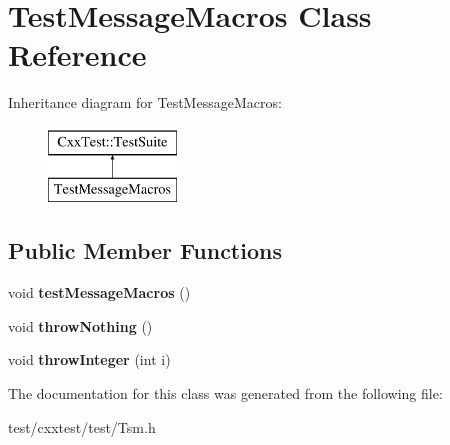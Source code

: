\hypertarget{classTestMessageMacros}{\section{Test\-Message\-Macros Class Reference}
\label{classTestMessageMacros}
}
Inheritance diagram for Test\-Message\-Macros\-:\begin{figure}[H]
\begin{center}
\leavevmode
\includegraphics[height=2.000000cm]{classTestMessageMacros}
\end{center}
\end{figure}
\subsection*{Public Member Functions}
\begin{DoxyCompactItemize}
\item 
\hypertarget{classTestMessageMacros_aef42480466574790df96a076bf029183}{void {\bfseries test\-Message\-Macros} ()}\label{classTestMessageMacros_aef42480466574790df96a076bf029183}

\item 
\hypertarget{classTestMessageMacros_adc88990a944cf8aadaa4abffa81a012c}{void {\bfseries throw\-Nothing} ()}\label{classTestMessageMacros_adc88990a944cf8aadaa4abffa81a012c}

\item 
\hypertarget{classTestMessageMacros_a99bd97161c31c0488f766d09325e2977}{void {\bfseries throw\-Integer} (int i)}\label{classTestMessageMacros_a99bd97161c31c0488f766d09325e2977}

\end{DoxyCompactItemize}


The documentation for this class was generated from the following file\-:\begin{DoxyCompactItemize}
\item 
test/cxxtest/test/Tsm.\-h\end{DoxyCompactItemize}

